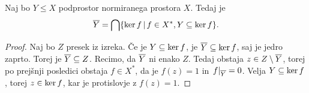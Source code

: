 \begin{izrek}
  Naj bo $Y \le X$ podprostor normiranega prostora $X$.
  Tedaj je
  \[
	\overline{Y} = \bigcap \{ \operatorname{ker} f \,|\, f \in X^*, Y \subseteq \operatorname{ker} f \}.
  \]
\end{izrek}

\begin{proof}
  Naj bo $Z$ presek iz izreka.
  Če je $Y \subseteq \operatorname{ker} f$, je $\overline{Y} \subseteq \operatorname{ker} f$, saj je jedro
  zaprto.
  Torej je $\overline{Y} \subseteq Z$.
  Recimo, da $\overline{Y}$ ni enako $Z$.
  Tedaj obstaja $z \in Z \setminus \overline{Y}$, torej po prejšnji posledici obstaja
  $f \in X^*$, da je $f(z) = 1$ in $\left. f \right|_{\overline{Y}} = 0$.
  Velja $Y \subseteq \operatorname{ker} f$, torej $z \in \operatorname{ker} f$, kar je protislovje z
  $f(z) = 1$.
\end{proof}

